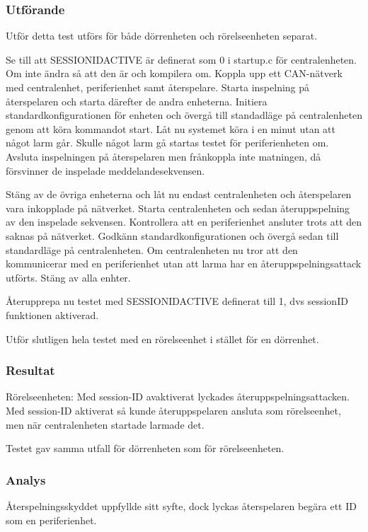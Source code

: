 \subsubsection*{Utförande}
Utför detta test utförs för både dörrenheten och rörelseenheten separat.


Se till att SESSIONIDACTIVE är definerat som 0 i startup.c för centralenheten.
Om inte ändra så att den är och kompilera om.
Koppla upp ett CAN-nätverk med centralenhet, periferienhet samt återspelare.
Starta inspelning på återspelaren och starta därefter de andra enheterna.
Initiera standardkonfigurationen för enheten och övergå till standadläge på centralenheten genom att köra kommandot start.
Låt nu systemet köra i en minut utan att något larm går.
Skulle något larm gå startas testet för periferienheten om.
Avsluta inspelningen på återspelaren men frånkoppla inte matningen, då försvinner de inspelade meddelandesekvensen.


Stäng av de övriga enheterna och låt nu endast centralenheten och återspelaren vara inkopplade på nätverket.
Starta centralenheten och sedan återuppspelning av den inspelade sekvensen. Kontrollera att en periferienhet ansluter trots att den saknas på nätverket.
Godkänn standardkonfigurationen och övergå sedan till standardläge på centralenheten.
Om centralenheten nu tror att den kommunicerar med en periferienhet utan att larma har en återuppspelningsattack utförts.
Stäng av alla enhter.

Återupprepa nu testet med SESSIONIDACTIVE definerat till 1, dvs sessionID funktionen aktiverad.

Utför slutligen hela testet med en rörelseenhet i stället för en dörrenhet.



\subsubsection*{Resultat}
Rörelseenheten: Med session-ID avaktiverat lyckades återuppspelningsattacken. Med session-ID aktiverat så kunde återuppspelaren ansluta som rörelseenhet, men när centralenheten startade larmade det.

Testet gav samma utfall för dörrenheten som för rörelseenheten.


\subsubsection*{Analys}
Återspelningsskyddet uppfyllde sitt syfte, dock lyckas återspelaren begära ett ID som en periferienhet.



